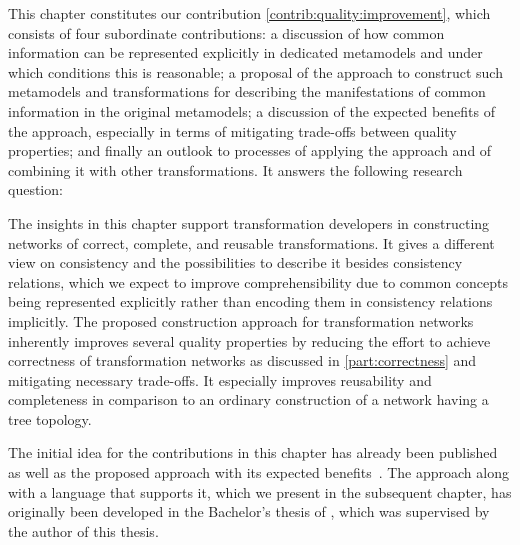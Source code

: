 This chapter constitutes our contribution \autoref{contrib:quality:improvement}, which consists of four subordinate contributions: a discussion of how common information can be represented explicitly in dedicated metamodels and under which conditions this is reasonable; a proposal of the \commonalities approach to construct such metamodels and transformations for describing the manifestations of common information in the original metamodels; a discussion of the expected benefits of the approach, especially in terms of mitigating trade-offs between quality properties; and finally an outlook to processes of applying the approach and of combining it with other transformations. It answers the following research question:


The insights in this chapter support transformation developers in constructing networks of correct, complete, and reusable transformations.
It gives a different view on consistency and the possibilities to describe it besides consistency relations, which we expect to improve comprehensibility due to common concepts being represented explicitly rather than encoding them in consistency relations implicitly.
The proposed construction approach for transformation networks inherently improves several quality properties by reducing the effort to achieve correctness of transformation networks as discussed in \autoref{part:correctness} and mitigating necessary trade-offs.
It especially improves reusability and completeness in comparison to an ordinary construction of a network having a tree topology.

The initial idea for the contributions in this chapter has already been published~ as well as the proposed \commonalities approach with its expected benefits~.
The approach along with a language that supports it, which we present in the subsequent chapter, has originally been developed in the Bachelor's thesis of , which was supervised by the author of this thesis.







